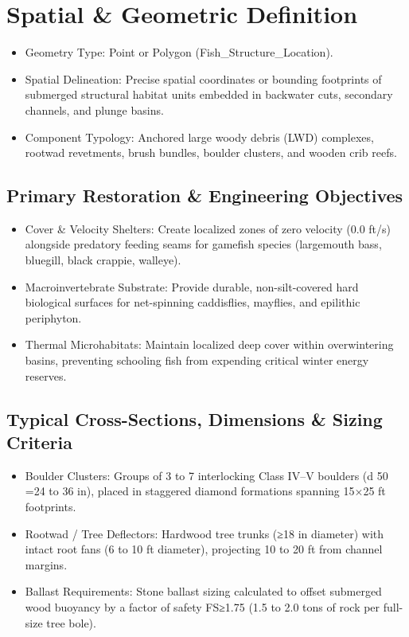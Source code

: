 \documentclass[
  letterpaper,
  DIV=11,
  numbers=noendperiod]{scrreprt}
\begin{document}
\section{Spatial \& Geometric
Definition}\label{spatial-geometric-definition-3}

\begin{itemize}
\item
  Geometry Type: Point or Polygon (Fish\_Structure\_Location).
\item
  Spatial Delineation: Precise spatial coordinates or bounding
  footprints of submerged structural habitat units embedded in backwater
  cuts, secondary channels, and plunge basins.
\item
  Component Typology: Anchored large woody debris (LWD) complexes,
  rootwad revetments, brush bundles, boulder clusters, and wooden crib
  reefs.
\end{itemize}

\subsection{Primary Restoration \& Engineering
Objectives}\label{primary-restoration-engineering-objectives-2}

\begin{itemize}
\item
  Cover \& Velocity Shelters: Create localized zones of zero velocity
  (0.0 ft/s) alongside predatory feeding seams for gamefish species
  (largemouth bass, bluegill, black crappie, walleye).
\item
  Macroinvertebrate Substrate: Provide durable, non-silt-covered hard
  biological surfaces for net-spinning caddisflies, mayflies, and
  epilithic periphyton.
\item
  Thermal Microhabitats: Maintain localized deep cover within
  overwintering basins, preventing schooling fish from expending
  critical winter energy reserves.
\end{itemize}

\subsection{Typical Cross-Sections, Dimensions \& Sizing
Criteria}\label{typical-cross-sections-dimensions-sizing-criteria-3}

\begin{itemize}
\item
  Boulder Clusters: Groups of 3 to 7 interlocking Class IV--V boulders
  (d 50 =24 to 36 in), placed in staggered diamond formations spanning
  15×25 ft footprints.
\item
  Rootwad / Tree Deflectors: Hardwood tree trunks (≥18 in diameter) with
  intact root fans (6 to 10 ft diameter), projecting 10 to 20 ft from
  channel margins.
\item
  Ballast Requirements: Stone ballast sizing calculated to offset
  submerged wood buoyancy by a factor of safety FS≥1.75 (1.5 to 2.0 tons
  of rock per full-size tree bole).
\end{itemize}
\end{document}
